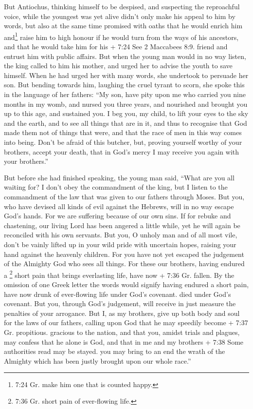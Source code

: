  But Antiochus, thinking himself to be despised, and
suspecting the reproachful voice, while the youngest was yet alive
didn't only make his appeal to him by words, but also at the same time
promised with oaths that he would enrich him and\footnote{7:24 Gr. make
  him one that is counted happy.} raise him to high honour if he would
turn from the ways of his ancestors, and that he would take him for his
+ 7:24 See 2 Maccabees 8:9. friend and entrust him with public affairs.
 But when the young man would in no way listen, the king
called to him his mother, and urged her to advise the youth to save
himself.  When he had urged her with many words, she
undertook to persuade her son.  But bending towards him,
laughing the cruel tyrant to scorn, she spoke this in the language of
her fathers: ``My son, have pity upon me who carried you nine months in
my womb, and nursed you three years, and nourished and brought you up to
this age, and sustained you.  I beg you, my child, to lift
your eyes to the sky and the earth, and to see all things that are in
it, and thus to recognise that God made them not of things that were,
and that the race of men in this way comes into being. 
Don't be afraid of this butcher, but, proving yourself worthy of your
brothers, accept your death, that in God's mercy I may receive you again
with your brothers.''

 But before she had finished speaking, the young man said,
``What are you all waiting for? I don't obey the commandment of the
king, but I listen to the commandment of the law that was given to our
fathers through Moses.  But you, who have devised all kinds
of evil against the Hebrews, will in no way escape God's hands.
 For we are suffering because of our own sins.
 If for rebuke and chastening, our living Lord has been
angered a little while, yet he will again be reconciled with his own
servants.  But you, O unholy man and of all most vile,
don't be vainly lifted up in your wild pride with uncertain hopes,
raising your hand against the heavenly children.  For you
have not yet escaped the judgement of the Almighty God who sees all
things.  For these our brothers, having endured a
\footnote{7:36 Gr. short pain of ever-flowing life.} short pain that
brings everlasting life, have now + 7:36 Gr. fallen. By the omission of
one Greek letter the words would signify having endured a short pain,
have now drunk of ever-flowing life under God's covenant. died under
God's covenant. But you, through God's judgement, will receive in just
measure the penalties of your arrogance.  But I, as my
brothers, give up both body and soul for the laws of our fathers,
calling upon God that he may speedily become + 7:37 Gr. propitious.
gracious to the nation, and that you, amidst trials and plagues, may
confess that he alone is God,  and that in me and my
brothers + 7:38 Some authorities read may be stayed. you may bring to an
end the wrath of the Almighty which has been justly brought upon our
whole race.''

